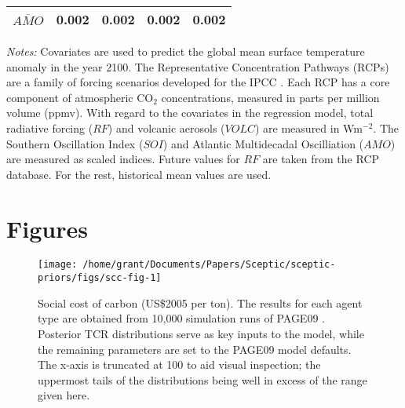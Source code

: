 \documentclass[
]{article}
\begin{document}
\begin{table}[h]
\begin{threeparttable}
\begin{tabularx}{.9\textwidth}{@{\extracolsep{1pt}} X A A A A }
            \\[-1.8ex] 
            $\overline{AMO}$                                                                    &\text{-}0.002 &\text{-}0.002   &\text{-}0.002  &\text{-}0.002  \\
            \bottomrule
        \end{tabularx}
        \begin{tablenotes}
            \footnotesize
            \item \textit{Notes:} Covariates are used to predict the global mean surface temperature anomaly in the year 2100. The Representative Concentration Pathways (RCPs) are a family of forcing scenarios developed for the IPCC \cite{van2011rcp}. Each RCP has a core component of atmospheric CO$_2$ concentrations, measured in parts per million volume (ppmv). With regard to the covariates in the regression model, total radiative forcing ($RF$) and volcanic aerosols ($VOLC$) are measured in Wm$^{-2}$. The Southern Oscillation Index ($SOI$) and Atlantic Multidecadal Oscilliation ($AMO$) are measured as scaled indices. Future values for $RF$ are taken from the RCP database. For the rest, historical mean values are used.
        \end{tablenotes}
    \end{threeparttable} 
    \label{tab:covariate}
\end{table}

\newpage
\pagebreak

\hypertarget{figures}{%
\section{Figures}\label{figures}}

\begin{figure}[h]

{\centering \texttt{[image: /home/grant/Documents/Papers/Sceptic/sceptic-priors/figs/scc-fig-1]} 

}

\caption{Social cost of carbon (US\$2005 per ton). The results for each agent type are obtained from 10,000 simulation runs of PAGE09 \cite{hope2011page09}. Posterior TCR distributions serve as key inputs to the model, while the remaining parameters are set to the PAGE09 model defaults. The x-axis is truncated at 100 to aid visual inspection; the uppermost tails of the distributions being well in excess of the range given here.}\label{fig:scc-fig}
\end{figure}

\newpage

  
\end{document}
